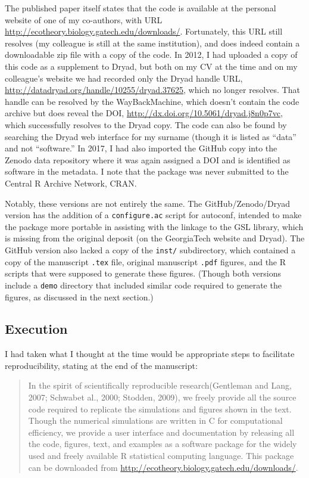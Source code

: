 \documentclass[
]{rescience}
\begin{document}
The published paper itself states that the code is available at the
personal website of one of my co-authors, with URL
\url{http://ecotheory.biology.gatech.edu/downloads/}. Fortunately, this
URL still resolves (my colleague is still at the same institution), and
does indeed contain a downloadable zip file with a copy of the code. In
2012, I had uploaded a copy of this code as a supplement to Dryad, but
both on my CV at the time and on my colleague's website we had recorded
only the Dryad handle URL,
\url{http://datadryad.org/handle/10255/dryad.37625}, which no longer
resolves. That handle can be resolved by the WayBackMachine, which
doesn't contain the code archive but does reveal the DOI,
\url{http://dx.doi.org/10.5061/dryad.j8n0p7vc}, which successfully
resolves to the Dryad copy. The code can also be found by searching the
Dryad web interface for my surname (though it is listed as ``data'' and
not ``software.'' In 2017, I had also imported the GitHub copy into the
Zenodo data repository where it was again assigned a DOI and is
identified as software in the metadata. I note that the package was
never submitted to the Central R Archive Network, CRAN.

Notably, these versions are not entirely the same. The
GitHub/Zenodo/Dryad version has the addition of a \texttt{configure.ac}
script for autoconf, intended to make the package more portable in
assisting with the linkage to the GSL library, which is missing from the
original deposit (on the GeorgiaTech website and Dryad). The GitHub
version also lacked a copy of the \texttt{inst/} subdirectory, which
contained a copy of the manuscript \texttt{.tex} file, original
manuscript \texttt{.pdf} figures, and the R scripts that were supposed
to generate these figures. (Though both versions include a \texttt{demo}
directory that included similar code required to generate the figures,
as discussed in the next section.)

\hypertarget{execution}{%
\subsection{Execution}\label{execution}}

I had taken what I thought at the time would be appropriate steps to
facilitate reproducibility, stating at the end of the manuscript:

\begin{quote}
In the spirit of scientifically reproducible research(Gentleman and
Lang, 2007; Schwabet al., 2000; Stodden, 2009), we freely provide all
the source code required to replicate the simulations and figures shown
in the text. Though the numerical simulations are written in C for
computational efficiency, we provide a user interface and documentation
by releasing all the code, figures, text, and examples as a software
package for the widely used and freely available R statistical computing
language. This package can be downloaded from
\url{http://ecotheory.biology.gatech.edu/downloads/}.
\end{quote}
\end{document}
